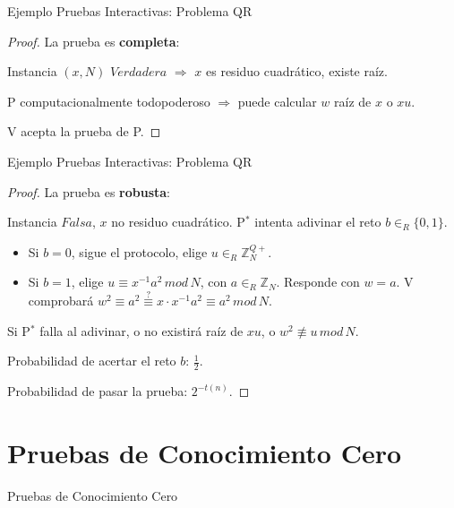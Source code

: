 \documentclass{beamer}
\begin{document}
\begin{frame}{Ejemplo Pruebas Interactivas: Problema QR}
	\begin{proof}
		La prueba es \textbf{completa}:
		
		Instancia $(x,N)$ $Verdadera$ $\Rightarrow$ $x$ es residuo cuadrático, existe raíz.
		
		P computacionalmente todopoderoso $\Rightarrow$ puede calcular $w$ raíz de $x$ o $xu$.
		
		V acepta la prueba de P.
	\end{proof}
\end{frame}

\begin{frame}{Ejemplo Pruebas Interactivas: Problema QR}
\begin{proof}
	La prueba es \textbf{robusta}:
	
	Instancia $Falsa$, $x$ no residuo cuadrático.
	P$^*$ intenta adivinar el reto $b\in_R\{0,1\}$.
	\begin{itemize}
		\item Si $b=0$, sigue el protocolo, elige $u \in_R \mathbb{Z}^{Q+}_N$.
		
		\item Si $b=1$, elige $u \equiv x^{-1} a^2 \, mod \, N$, con $a \in_R \mathbb{Z}_N$.
		Responde con $w = a$.		
		V comprobará $w^2\equiv a^2 \overset{?}{\equiv} x\cdot x^{-1} a^2 \equiv a^2 \, mod \, N$.
	\end{itemize}

	Si P$^*$ falla al adivinar, o no existirá raíz de $xu$, o $w^2 \not \equiv u \, mod \, N$.
	
	Probabilidad de acertar el reto $b$: $\frac{1}{2}$.
	
	Probabilidad de pasar la prueba: $2^{-t(n)}$.
	
\end{proof}
\end{frame}



\section{Pruebas de Conocimiento Cero}

\begin{frame}{Pruebas de Conocimiento Cero}
	
\end{frame}
\end{document}
